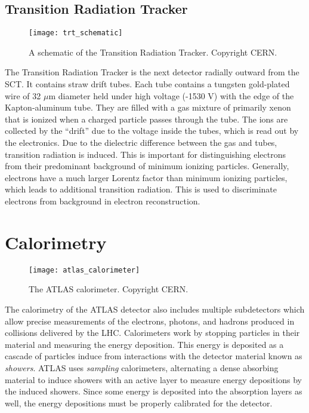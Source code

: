 \subsection{Transition Radiation Tracker}
\begin{figure}[tbp]
\caption{A schematic of the Transition Radiation Tracker. Copyright CERN.} \label{fig:trt_schematic}
\texttt{[image: trt\_schematic]}
\end{figure}
The Transition Radiation Tracker is the next detector radially outward from the SCT.
It contains straw drift tubes.
Each tube contains a tungsten gold-plated wire of 32 $\mu$m diameter held under high voltage (-1530 V) with the edge of the Kapton-aluminum tube.
They are filled with a gas mixture of primarily xenon that is ionized when a charged particle passes through the tube.
The ions are collected by the ``drift'' due to the voltage inside the tubes, which is read out by the electronics.
Due to the dielectric difference between the gas and tubes, transition radiation is induced.
This is important for distinguishing electrons from their predominant background of minimum ionizing particles.
Generally, electrons have a much larger Lorentz factor than minimum ionizing particles, which leads to additional transition radiation.
This is used to discriminate electrons from background in electron reconstruction.

\section{Calorimetry}
\begin{figure}[tbp]
\caption{The ATLAS calorimeter. Copyright CERN.} \label{fig:atlas_calorimeter}
\texttt{[image: atlas\_calorimeter]}
\end{figure}

The calorimetry of the ATLAS detector also includes multiple subdetectors which allow precise measurements of the electrons, photons, and hadrons produced in collisions delivered by the LHC.
Calorimeters work by stopping particles in their material and measuring the energy deposition.
This energy is deposited as a cascade of particles induce from interactions with the detector material known as \textit{showers}.
ATLAS uses \textit{sampling} calorimeters, alternating a dense absorbing material to induce showers with an active layer to measure energy depositions by the induced showers.
Since some energy is deposited into the absorption layers as well, the energy depositions must be properly calibrated for the detector.

